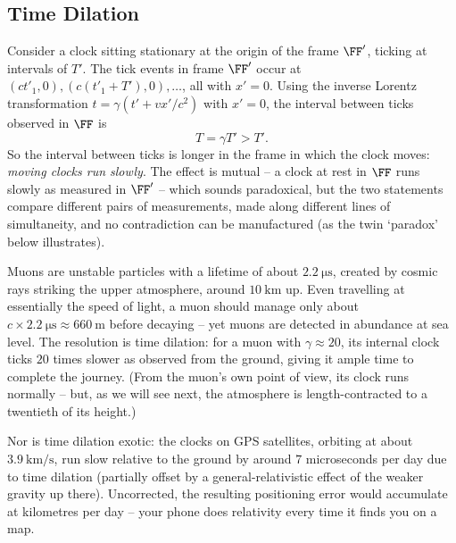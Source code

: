\documentclass[a4paper]{scrartcl}
\begin{document}
\subsection{Time Dilation}

Consider a clock sitting stationary at the origin of the frame $\FF'$, ticking at intervals of $T'$. The tick events in frame $\FF'$ occur at $(ct'_1, 0), (c(t'_1 + T'), 0), \dots$, all with $x' = 0$. Using the inverse Lorentz transformation $t = \gamma(t' + vx'/c^2)$ with $x' = 0$, the interval between ticks observed in $\FF$ is
$$
T = \gamma T' > T'.
$$
So the interval between ticks is longer in the frame in which the clock moves: \emph{moving clocks run slowly}. The effect is mutual -- a clock at rest in $\FF$ runs slowly as measured in $\FF'$ -- which sounds paradoxical, but the two statements compare different pairs of measurements, made along different lines of simultaneity, and no contradiction can be manufactured (as the twin `paradox' below illustrates).

\begin{example}
	Muons are unstable particles with a lifetime of about $\SI{2.2}{\micro\second}$, created by cosmic rays striking the upper atmosphere, around $\SI{10}{\kilo\meter}$ up. Even travelling at essentially the speed of light, a muon should manage only about $c \times \SI{2.2}{\micro\second} \approx \SI{660}{\meter}$ before decaying -- yet muons are detected in abundance at sea level. The resolution is time dilation: for a muon with $\gamma \approx 20$, its internal clock ticks $20$ times slower as observed from the ground, giving it ample time to complete the journey. (From the muon's own point of view, its clock runs normally -- but, as we will see next, the atmosphere is length-contracted to a twentieth of its height.)

	Nor is time dilation exotic: the clocks on GPS satellites, orbiting at about $\SI{3.9}{\kilo\meter\per\second}$, run slow relative to the ground by around $7$ microseconds per day due to time dilation (partially offset by a general-relativistic effect of the weaker gravity up there). Uncorrected, the resulting positioning error would accumulate at kilometres per day -- your phone does relativity every time it finds you on a map.
\end{example}
\end{document}
